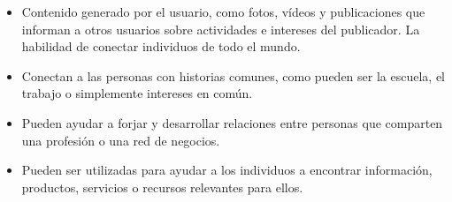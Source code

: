 \begin{itemize}
	\itemsep1pt \parskip1pt 
	\item Contenido generado por el usuario, como fotos, vídeos y publicaciones que informan a otros usuarios sobre actividades e intereses del publicador.
La habilidad de conectar individuos de todo el mundo.
	\item Conectan a las personas con historias comunes, como pueden ser la escuela, el trabajo o simplemente intereses en común.
	\item Pueden ayudar a forjar y desarrollar relaciones entre personas que comparten una profesión o una red de negocios.
	\item Pueden ser utilizadas para ayudar a los individuos a encontrar información, productos, servicios o recursos relevantes para ellos.
\end{itemize}

